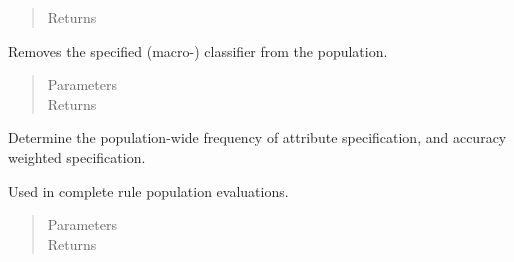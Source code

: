 \documentclass[letterpaper,10pt,english]{sphinxmanual}
\begin{document}
\begin{fulllineitems}
\begin{fulllineitems}
\begin{quote}
\begin{description}
\item[{Returns}] \leavevmode


\end{description}\end{quote}

\end{fulllineitems}


\begin{fulllineitems}
\label{\detokenize{eLCS:eLCS.ClassifierSet.ClassifierSet.removeMacroClassifier}}
Removes the specified (macro-) classifier from the population.
\begin{quote}\begin{description}
\item[{Parameters}] \leavevmode
{} \textendash{} 

\item[{Returns}] \leavevmode


\end{description}\end{quote}

\end{fulllineitems}


\begin{fulllineitems}
\label{\detokenize{eLCS:eLCS.ClassifierSet.ClassifierSet.runAttGeneralitySum}}
Determine the population-wide frequency of attribute specification, and accuracy weighted specification.

Used in complete rule population evaluations.
\begin{quote}\begin{description}
\item[{Parameters}] \leavevmode
{} \textendash{} 

\item[{Returns}] \leavevmode


\end{description}\end{quote}

\end{fulllineitems}


\end{fulllineitems}
\end{document}
